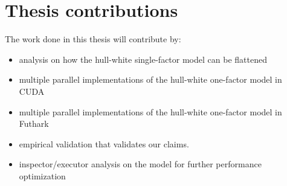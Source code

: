 \section{Thesis contributions}
\label{section:thesiscontributions}
The work done in this thesis will contribute by: 
\begin{itemize}
    \item analysis on how the hull-white single-factor model can be flattened
    \item multiple parallel implementations of the hull-white one-factor model in CUDA
    \item multiple parallel implementations of the hull-white one-factor model in Futhark
    \item empirical validation that validates our claims. 
    \item inspector/executor analysis on the model for further performance optimization 
\end{itemize}
	
	


